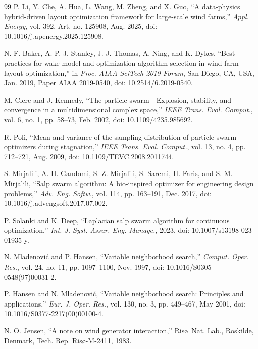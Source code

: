 \begin{thebibliography}{99}
P. Li, Y. Che, A. Hua, L. Wang, M. Zheng, and X. Guo, ``A data-physics hybrid-driven layout optimization framework for large-scale wind farms,'' \textit{Appl. Energy}, vol. 392, Art. no. 125908, Aug. 2025, doi: 10.1016/j.apenergy.2025.125908.

N. F. Baker, A. P. J. Stanley, J. J. Thomas, A. Ning, and K. Dykes, ``Best practices for wake model and optimization algorithm selection in wind farm layout optimization,'' in \textit{Proc. AIAA SciTech 2019 Forum}, San Diego, CA, USA, Jan. 2019, Paper AIAA 2019-0540, doi: 10.2514/6.2019-0540.

M. Clerc and J. Kennedy, ``The particle swarm---Explosion, stability, and convergence in a multidimensional complex space,'' \textit{IEEE Trans. Evol. Comput.}, vol. 6, no. 1, pp. 58--73, Feb. 2002, doi: 10.1109/4235.985692.

R. Poli, ``Mean and variance of the sampling distribution of particle swarm optimizers during stagnation,'' \textit{IEEE Trans. Evol. Comput.}, vol. 13, no. 4, pp. 712--721, Aug. 2009, doi: 10.1109/TEVC.2008.2011744.

S. Mirjalili, A. H. Gandomi, S. Z. Mirjalili, S. Saremi, H. Faris, and S. M. Mirjalili, ``Salp swarm algorithm: A bio-inspired optimizer for engineering design problems,'' \textit{Adv. Eng. Softw.}, vol. 114, pp. 163--191, Dec. 2017, doi: 10.1016/j.advengsoft.2017.07.002.

P. Solanki and K. Deep, ``Laplacian salp swarm algorithm for continuous optimization,'' \textit{Int. J. Syst. Assur. Eng. Manage.}, 2023, doi: 10.1007/s13198-023-01935-y.

N. Mladenovi\'c and P. Hansen, ``Variable neighborhood search,'' \textit{Comput. Oper. Res.}, vol. 24, no. 11, pp. 1097--1100, Nov. 1997, doi: 10.1016/S0305-0548(97)00031-2.

P. Hansen and N. Mladenovi\'c, ``Variable neighborhood search: Principles and applications,'' \textit{Eur. J. Oper. Res.}, vol. 130, no. 3, pp. 449--467, May 2001, doi: 10.1016/S0377-2217(00)00100-4.

N. O. Jensen, ``A note on wind generator interaction,'' Ris\o\ Nat. Lab., Roskilde, Denmark, Tech. Rep. Ris\o-M-2411, 1983.


\end{thebibliography}
